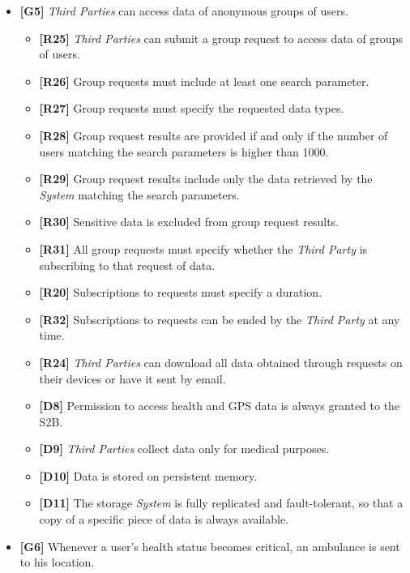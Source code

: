 \documentclass[titlepage]{article}
\begin{document}
\begin{itemize}
   				 \item {\bf [G5]} {\it Third Parties} can access data of anonymous groups of users.
				  \begin{itemize} %
					 	\item {\bf [R25]} {\it Third Parties} can submit a group request to access data of groups of users. 
\item {\bf [R26]}  Group requests must include at least one search parameter. 
\item {\bf [R27]}  Group requests must specify the requested data types. 
\item {\bf [R28]}  Group request results are provided if and only if the number of users matching the search parameters is higher than 1000. 
\item {\bf [R29]} Group request results include only the data retrieved by the {\it System} matching the search parameters. 
\item {\bf [R30]} Sensitive data is excluded from group request results. 
\item {\bf [R31]} All group requests must specify whether the {\it Third Party} is subscribing to that request of data. 
\item {\bf [R20]} Subscriptions to requests must specify a duration.
\item {\bf [R32]}  Subscriptions to requests can be ended by the {\it Third Party} at any time.
\item {\bf [R24]}  {\it Third Parties} can download all data obtained through requests on their devices or have it sent by email.
\item {\bf [D8]}  Permission to access health and GPS data is always granted to the S2B.
\item {\bf [D9]} {\it Third Parties} collect data only for medical purposes.
\item {\bf [D10]} Data is stored on persistent memory. 
\item {\bf [D11]}  The storage {\it System} is fully replicated and fault-tolerant, so that a copy of a specific piece of data is always available.
									
					\end{itemize}

   				 \item {\bf [G6]} Whenever a user’s health status becomes critical, an ambulance is sent to his location.
				 

\end{itemize}
\end{document}
